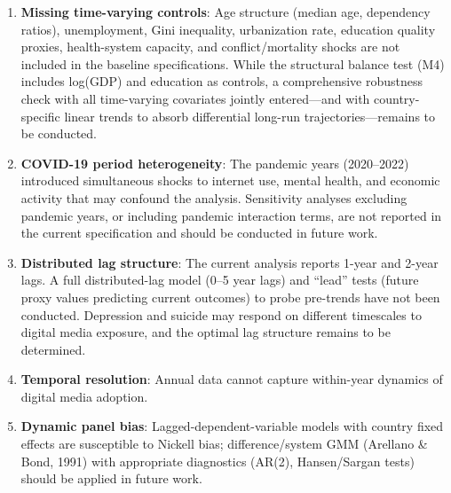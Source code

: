 \documentclass[a4paper,11pt,titlepage]{article}
\begin{document}
\begin{enumerate}
  \item \textbf{Missing time-varying controls}: Age structure (median age, dependency ratios), unemployment, Gini inequality, urbanization rate, education quality proxies, health-system capacity, and conflict/mortality shocks are not included in the baseline specifications. While the structural balance test (M4) includes log(GDP) and education as controls, a comprehensive robustness check with all time-varying covariates jointly entered---and with country-specific linear trends to absorb differential long-run trajectories---remains to be conducted.
  \item \textbf{COVID-19 period heterogeneity}: The pandemic years (2020--2022) introduced simultaneous shocks to internet use, mental health, and economic activity that may confound the analysis. Sensitivity analyses excluding pandemic years, or including pandemic interaction terms, are not reported in the current specification and should be conducted in future work.
  \item \textbf{Distributed lag structure}: The current analysis reports 1-year and 2-year lags. A full distributed-lag model (0--5 year lags) and ``lead'' tests (future proxy values predicting current outcomes) to probe pre-trends have not been conducted. Depression and suicide may respond on different timescales to digital media exposure, and the optimal lag structure remains to be determined.
  \item \textbf{Temporal resolution}: Annual data cannot capture within-year dynamics of digital media adoption.
  \item \textbf{Dynamic panel bias}: Lagged-dependent-variable models with country fixed effects are susceptible to Nickell bias; difference/system GMM (Arellano \& Bond, 1991) with appropriate diagnostics (AR(2), Hansen/Sargan tests) should be applied in future work.

\end{enumerate}
\end{document}
